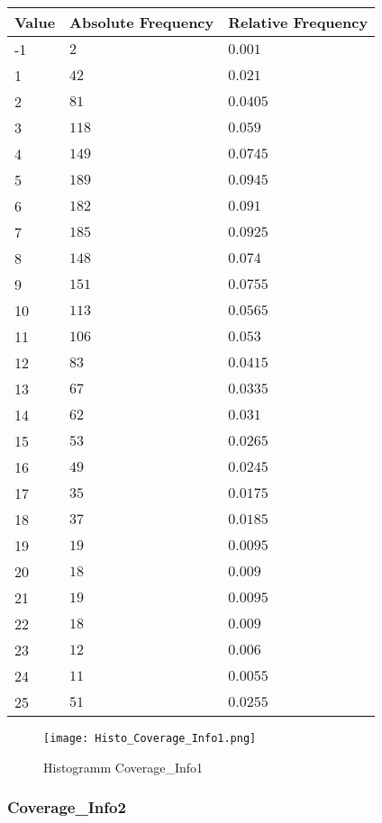 \begin{table}[H]
	\renewcommand{\arraystretch}{1.25}
	\begin{tabular}{l|l|l}
		\textbf{Value} & \textbf{Absolute Frequency} & \textbf{Relative Frequency}\\\hline
		-1&$2$&$0.001$\\\hline
		1&$42$&$0.021$\\\hline
		2&$81$&$0.0405$\\\hline
		3&$118$&$0.059$\\\hline
		4&$149$&$0.0745$\\\hline
		5&$189$&$0.0945$\\\hline
		6&$182$&$0.091$\\\hline
		7&$185$&$0.0925$\\\hline
		8&$148$&$0.074$\\\hline
		9&$151$&$0.0755$\\\hline
		10&$113$&$0.0565$\\\hline
		11&$106$&$0.053$\\\hline
		12&$83$&$0.0415$\\\hline
		13&$67$&$0.0335$\\\hline
		14&$62$&$0.031$\\\hline
		15&$53$&$0.0265$\\\hline
		16&$49$&$0.0245$\\\hline
		17&$35$&$0.0175$\\\hline
		18&$37$&$0.0185$\\\hline
		19&$19$&$0.0095$\\\hline
		20&$18$&$0.009$\\\hline
		21&$19$&$0.0095$\\\hline
		22&$18$&$0.009$\\\hline
		23&$12$&$0.006$\\\hline
		24&$11$&$0.0055$\\\hline
		25&$51$&$0.0255$
	\end{tabular}
\end{table}

\begin{figure}[H]
	\begin{center}
		\texttt{[image: Histo\_Coverage\_Info1.png]}
	\end{center}
	\caption{Histogramm Coverage\_Info1}
\end{figure}

\subsubsection{Coverage\_Info2}
